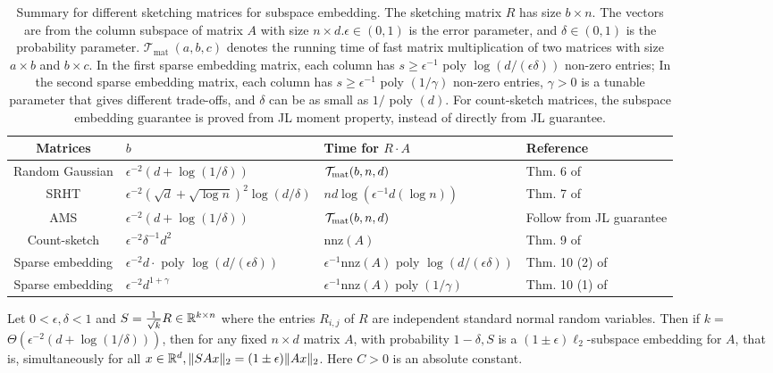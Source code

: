 \begin{table*}[!ht]
    \centering
\begin{tabular}{|c|l|l|l|}
\hline {\bf Matrices} & $b$ & {\bf Time for} $R \cdot A$ & {\bf Reference} \\
\hline Random Gaussian & $\epsilon^{-2}(d+\log (1 / \delta))$ & ${\cal T}_{\mathrm{mat}}(b, n, d)$ & Thm. 6 of \cite{w14} \\
\hline SRHT & $\epsilon^{-2}(\sqrt{d}+\sqrt{\log n})^2 \log (d / \delta)$ & $n d \log  (\epsilon^{-1} d(\log n) )$ & Thm. 7 of \cite{w14} \\
\hline AMS & $\epsilon^{-2}(d+\log (1 / \delta))$ & ${\cal T}_{\mathrm{mat}}(b, n, d)$ & Follow from JL guarantee \\
\hline Count-sketch & $\epsilon^{-2} \delta^{-1} d^2$ & $\mathrm{nnz}(A)$ & Thm. 9 of \cite{w14} \\
\hline Sparse embedding & $\epsilon^{-2} d \cdot$ poly $\log (d /(\epsilon \delta))$ & $\epsilon^{-1} \mathrm{nnz}(A)$ poly $\log (d /(\epsilon \delta))$ & Thm. 10 (2) of \cite{w14} \\
\hline Sparse embedding& $\epsilon^{-2} d^{1+\gamma}$ & $\epsilon^{-1} \mathrm{nnz}(A) \operatorname{poly}(1 / \gamma)$ & Thm. 10 (1) of \cite{w14} \\
\hline
\end{tabular}
\caption{Summary for different sketching matrices for subspace embedding. The sketching matrix $R$ has size $b \times n$. The vectors are from the column subspace of matrix $A$ with size $n \times d . \epsilon \in(0,1)$ is the error parameter, and $\delta \in(0,1)$ is the probability parameter. $\mathcal{T}_{\text {mat }}(a, b, c)$ denotes the running time of fast matrix multiplication of two matrices with size $a \times b$ and $b \times c .$ In the first sparse embedding matrix, each column has $s \geq \epsilon^{-1}$ poly $\log (d /(\epsilon \delta))$ non-zero entries;  In the second sparse embedding matrix, each column has $s \geq \epsilon^{-1}$ poly $(1 / \gamma)$ non-zero entries, $\gamma>0$ is a tunable parameter that gives different trade-offs, and $\delta$ can be as small as $1 /$ poly $(d).$ For count-sketch matrices, the subspace embedding guarantee is proved from JL moment property, instead of directly from JL guarantee.}
\label{tab:summary_sketching}
\end{table*}

\begin{lemma}\label{lem:rand_gauss}
    Let $0<\epsilon, \delta <1$ and $S=\frac{1}{\sqrt{k}}   R \in \mathbb{R}^{k \times n}$ where the entries $  R_{i, j}$ of $  R$ are independent standard normal random variables. Then if $k=$ $\Theta (\epsilon^{-2}(d+\log (1 / \delta))  )$, then for any fixed $n \times d$ matrix $A$, with probability $1-\delta, S$ is a $(1 \pm \epsilon) \ell_2$-subspace embedding for $A$, that is, simultaneously for all $x \in \mathbb{R}^d, \| S A x\|_2=(1 \pm \epsilon)\|A x\|_2$. Here $C>0$ is an absolute constant.
\end{lemma}


